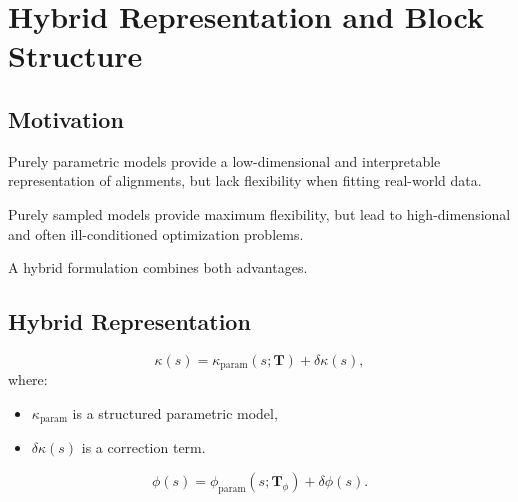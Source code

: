 \section{Hybrid Representation and Block Structure}

\subsection{Motivation}

\begin{remark}
Purely parametric models provide a low-dimensional and interpretable
representation of alignments, but lack flexibility when fitting
real-world data.
\end{remark}

\begin{remark}
Purely sampled models provide maximum flexibility, but lead to
high-dimensional and often ill-conditioned optimization problems.
\end{remark}

\begin{remark}
A hybrid formulation combines both advantages.
\end{remark}

\subsection{Hybrid Representation}

\begin{definition}
\[
\kappa(s)
=
\kappa_{\mathrm{param}}(s;\mathbf{T})
+
\delta\kappa(s),
\]
where:
\begin{itemize}
\item \(\kappa_{\mathrm{param}}\) is a structured parametric model,
\item \(\delta\kappa(s)\) is a correction term.
\end{itemize}
\end{definition}

\begin{definition}
\[
\phi(s)
=
\phi_{\mathrm{param}}(s;\mathbf{T}_\phi)
+
\delta\phi(s).
\]
\end{definition}


